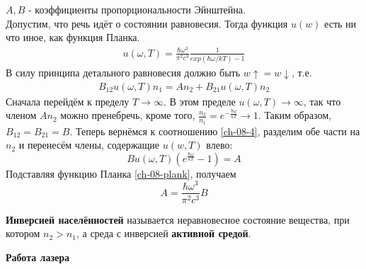 \documentclass[__main__.tex]{subfiles}
\begin{document}
$A, B$ - коэффициенты пропорциональности Эйнштейна.\\
Допустим, что речь идёт о состоянии равновесия. Тогда функция $u(w)$ есть ни что иное, как функция Планка.
\begin{gather}
	u(\omega, T) = \frac{\hbar\omega^3}{\pi^2c^3}\frac{1}{exp(\hbar\omega/kT) - 1}
	\label{ch-08-plank}
\end{gather}
В силу принципа детального равновесия должно быть $w\uparrow = w\downarrow$, т.е.
\begin{gather}
	B_{12}u(\omega, T)n_1 = An_2 + B_{21}u(\omega, T)n_2
	\label{ch-08-4}
\end{gather}
Сначала перейдём к пределу $T\rightarrow \infty$. В этом пределе $u(\omega, T) \rightarrow \infty$, так что членом $An_2$ можно пренебречь, кроме того, $\frac{n_2}{n_1} =e^{-\frac{\hbar\omega}{kT}} \rightarrow 1.$ Таким образом, $B_{12} = B_{21} = B$. Теперь вернёмся к соотношению \ref{ch-08-4}, разделим обе части на $n_2$ и перенесём члены, содержащие $u(w, T)$ влево:
$$Bu(\omega, T)(e^{\frac{\hbar\omega}{kT}} - 1) = A$$ 
Подставляя функцию Планка \ref{ch-08-plank}, получаем
$$
A = \frac{\hbar\omega^3}{\pi^2c^3}B
$$
\begin{definition}
	\textbf{Инверсией населённостей} называется неравновесное состояние вещества, при котором $n_2 > n_1$, а среда с инверсией \textbf{активной средой}.  
\end{definition}
\textbf{Работа лазера}
\end{document}
